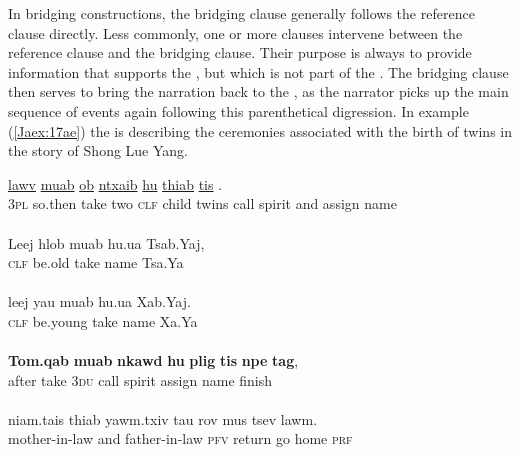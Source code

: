 \documentclass[output=paper]{LSP/langsci}
\begin{document}
In  bridging constructions, the bridging clause generally follows the reference clause directly. Less commonly, one or more clauses intervene between the reference clause and the bridging clause. Their purpose is always to provide information that supports the , but which is not part of the . The bridging clause then serves to bring the narration back to the , as the narrator picks up the main sequence of events again following this parenthetical digression. In example (\ref{Jaex:17ae}) the  is describing the ceremonies associated with the birth of twins in the story of Shong Lue Yang.
%
\begin{exe}
\ex \label{Jaex:17ae}
\begin{xlist}
\ex \label{Jaex:17a}
\gll \underline{lawv} \underline{} \underline{muab} \underline{ob} \underline{} \underline{}     \underline{ntxaib} \underline{hu} \underline{} \underline{thiab}     \underline{tis} \underline{}.\\
\textsc{3pl} so.then take two \textsc{clf} child twins call spirit and assign name\\
\glt {}\\
\ex \label{Jaex:17b}
\gll Leej hlob muab hu.ua  Tsab.Yaj,\\
\textsc{clf} be.old take name Tsa.Ya\\ 
\glt {}\\
\ex \label{Jaex:17c}
\gll leej yau  muab hu.ua Xab.Yaj.\\		
 \textsc{clf} be.young take name Xa.Ya \\ 
\glt {}\\
\ex \label{Jaex:17d}
\gll \textbf{Tom.qab} \textbf{muab}  \textbf{nkawd} \textbf{hu} \textbf{plig} \textbf{tis} \textbf{npe} \textbf{tag},\\		           
 after take \textsc{3du} call spirit assign name finish\\
\glt {}\\
\ex \label{Jaex:17e}
\gll niam.tais thiab yawm.txiv  tau rov mus tsev lawm.\\     	      
mother-in-law and father-in-law \textsc{pfv} return go home \textsc{prf}\\
\glt {} \citep[][33]{vang90}
\end{xlist}
\end{exe}
\end{document}

